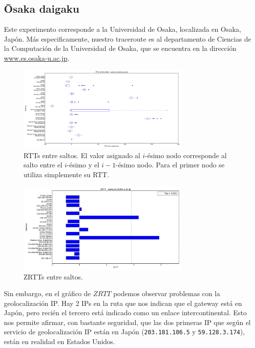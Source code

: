 \subsection{Ōsaka daigaku}

Este experimento corresponde a la Universidad de Osaka, localizada en Osaka, Japón. Más especificamente, nuestro traceroute es al departamento de Ciencias de la Computación de la Universidad de Osaka, que se encuentra en la dirección \url{www.es.osaka-u.ac.jp}.

\begin{figure}[H]
    \centering
    \includegraphics[width=8.5cm]{img/grafico1-www-es-osaka-u-ac-jp.pdf}
    \caption{\normalfont RTTs entre saltos. El valor asignado al $i$-ésimo nodo corresponde al salto entre el $i$-ésimo y el $i - 1$-ésimo nodo. Para el primer nodo se utiliza simplemente su RTT.}
\end{figure}

\begin{figure}[H]
    \centering
    \includegraphics[width=8.5cm]{img/grafico2-www-es-osaka-u-ac-jp.pdf}
    \caption{\normalfont ZRTTs entre saltos.}
\end{figure}

Sin embargo, en el gráfico de $ZRTT$ podemos observar problemas con la geolocalización IP. Hay 2 IPs en la ruta que nos indican que el gateway está en Japón, pero recién el tercero está indicado como un enlace intercontinental.
Esto nos permite afirmar, con bastante seguridad, que las dos primeras IP que según el servicio de geolocalización IP están en Japón (\texttt{203.181.106.5} y \texttt{59.128.3.174}), están en realidad en Estados Unidos.

